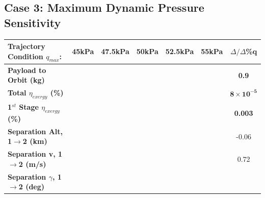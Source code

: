 \subsection{Case 3: Maximum Dynamic Pressure Sensitivity}\label{sec:qvariation}



\begin{table}[ht!] %
	\centering
	\begin{tabular}{l c c c c c c} 
		\hline \textbf{Trajectory Condition  \qquad  $q_{max}$: }
		&45kPa
		&47.5kPa
		&50kPa
		& 52.5kPa
		& 55kPa
		& $\Delta/\Delta$\%q
	\\
	\hline \textbf{Payload to Orbit (kg)}
	& \textbf{\PayloadToOrbitqFortyFiveNoReturn}
	& \textbf{\PayloadToOrbitqFortySevenNoReturn}
	& \textbf{\PayloadToOrbitqStandardNoReturn}
	& \textbf{\PayloadToOrbitqFiftyTwoNoReturn}
	& \textbf{\PayloadToOrbitqFiftyFiveNoReturn}
	&\textbf{0.9}
	\\
	\textbf{Total $\eta_{exergy}$ (\%)}
	& \textbf{\totalExergyEffqFortyFiveNoReturn}
	& \textbf{\totalExergyEffqFortySevenNoReturn}
	& \textbf{\totalExergyEffqStandardNoReturn}
	& \textbf{\totalExergyEffqFiftyTwoNoReturn}
	& \textbf{\totalExergyEffqFiftyFiveNoReturn}
	& \textbf{$\bm{8\times10^{-5}}$}
	\\
	\hline 
	\textbf{1$^{st}$ Stage $\eta_{exergy}$ (\%)}
	& \textbf{\firstExergyEffqFortyFiveNoReturn}
	& \textbf{\firstExergyEffqFortySevenNoReturn}
	& \textbf{\firstExergyEffqStandardNoReturn}
	& \textbf{\firstExergyEffqFiftyTwoNoReturn}
	& \textbf{\firstExergyEffqFiftyFiveNoReturn}
	& \textbf{0.003}
	\\
	\textbf{Separation Alt, 1$\rightarrow$2 (km)}
	& \firstsecondSeparationAltqFortyFiveNoReturn
	& \firstsecondSeparationAltqFortySevenNoReturn
	& \firstsecondSeparationAltqStandardNoReturn
	& \firstsecondSeparationAltqFiftyTwoNoReturn
	& \firstsecondSeparationAltqFiftyFiveNoReturn
	&-0.06
	\\
	\textbf{Separation v, 1$\rightarrow$2 (m/s)}
	& \firstsecondSeparationvqFortyFiveNoReturn
	& \firstsecondSeparationvqFortySevenNoReturn
	& \firstsecondSeparationvqStandardNoReturn
	& \firstsecondSeparationvqFiftyTwoNoReturn
	& \firstsecondSeparationvqFiftyFiveNoReturn
	&0.72
	\\
	\textbf{Separation $\gamma$, 1$\rightarrow$2 (deg)}
	& \firstsecondSeparationgammaqFortyFiveNoReturn
	& \firstsecondSeparationgammaqFortySevenNoReturn
	& \firstsecondSeparationgammaqStandardNoReturn
	& \firstsecondSeparationgammaqFiftyTwoNoReturn
	& \firstsecondSeparationgammaqFiftyFiveNoReturn

\end{tabular}
\end{table}
